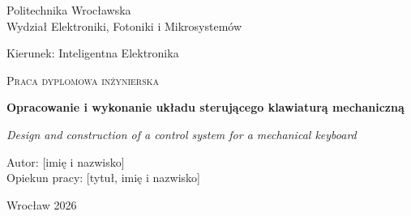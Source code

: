 \begin{titlepage}
  \centering
  {\large Politechnika Wrocławska\\Wydział Elektroniki, Fotoniki i Mikrosystemów\par}
  \vspace{1em}
  {Kierunek: Inteligentna Elektronika\par}
  \vfill
  {\Large\textsc{Praca dyplomowa inżynierska}\par}
  \vspace{2em}
  {\LARGE\bfseries Opracowanie i wykonanie układu sterującego klawiaturą mechaniczną\par}
  \vspace{1em}
  {\large\itshape Design and construction of a control system for a mechanical keyboard\par}
  \vfill
  \begin{flushright}
    Autor: [imię i nazwisko]\\[0.5em]
    Opiekun pracy: [tytuł, imię i nazwisko]
  \end{flushright}
  \vfill
  {Wrocław 2026\par}
\end{titlepage}

